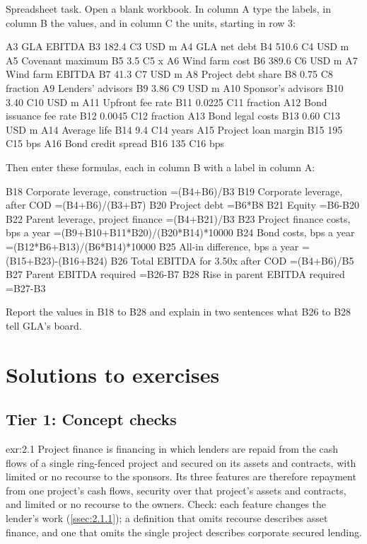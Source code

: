 \begin{exercise}\label{exr:2.14}
Spreadsheet task. Open a blank workbook. In column A type the labels, in column B the values, and in column C the units, starting in row 3:
\begin{excel}
A3  GLA EBITDA                  B3  182.4    C3  USD m
A4  GLA net debt                B4  510.6    C4  USD m
A5  Covenant maximum            B5  3.5      C5  x
A6  Wind farm cost              B6  389.6    C6  USD m
A7  Wind farm EBITDA            B7  41.3     C7  USD m
A8  Project debt share          B8  0.75     C8  fraction
A9  Lenders' advisors           B9  3.86     C9  USD m
A10 Sponsor's advisors          B10 3.40     C10 USD m
A11 Upfront fee rate            B11 0.0225   C11 fraction
A12 Bond issuance fee rate      B12 0.0045   C12 fraction
A13 Bond legal costs            B13 0.60     C13 USD m
A14 Average life                B14 9.4      C14 years
A15 Project loan margin         B15 195      C15 bps
A16 Bond credit spread          B16 135      C16 bps
\end{excel}
Then enter these formulas, each in column B with a label in column A:
\begin{excel}
B18  Corporate leverage, construction     =(B4+B6)/B3
B19  Corporate leverage, after COD        =(B4+B6)/(B3+B7)
B20  Project debt                         =B6*B8
B21  Equity                               =B6-B20
B22  Parent leverage, project finance     =(B4+B21)/B3
B23  Project finance costs, bps a year    =(B9+B10+B11*B20)/(B20*B14)*10000
B24  Bond costs, bps a year               =(B12*B6+B13)/(B6*B14)*10000
B25  All-in difference, bps a year        =(B15+B23)-(B16+B24)
B26  Total EBITDA for 3.50x after COD     =(B4+B6)/B5
B27  Parent EBITDA required               =B26-B7
B28  Rise in parent EBITDA required       =B27-B3
\end{excel}
Report the values in B18 to B28 and explain in two sentences what B26 to B28 tell GLA's board.
\end{exercise}

\section{Solutions to exercises}\label{sec:2.14}

\subsection*{Tier 1: Concept checks}

\begin{solution}{exr:2.1}
Project finance is financing in which lenders are repaid from the cash flows of a single ring-fenced project and secured on its assets and contracts, with limited or no recourse to the sponsors. Its three features are therefore repayment from one project's cash flows, security over that project's assets and contracts, and limited or no recourse to the owners. Check: each feature changes the lender's work (\cref{ssec:2.1.1}); a definition that omits recourse describes asset finance, and one that omits the single project describes corporate secured lending.
\end{solution}


